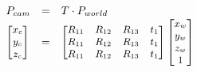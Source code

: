 \begin{equation}
  \begin{array}{lll}
    P_{cam} & = & T \cdot P_{world} \\
    \begin{small}
      \left[ 
        \begin{matrix} 
          x_c \\
          y_c \\
          z_c \\
        \end{matrix} 
      \right] 
    \end{small}
    & = & 
      \begin{small}
      \left[ 
        \begin{matrix} 
          R_{11} & R_{12} & R_{13} & t_1 \\
          R_{11} & R_{12} & R_{13} & t_1  \\
          R_{11} & R_{12} & R_{13} & t_1  \\
        \end{matrix} 
      \right] 
      \left[ 
        \begin{matrix} 
          x_w \\
          y_w \\
          z_w \\
          1
        \end{matrix} 
      \right] 
    \end{small}
  \end{array}
\label{eq:idp1}
\end{equation}